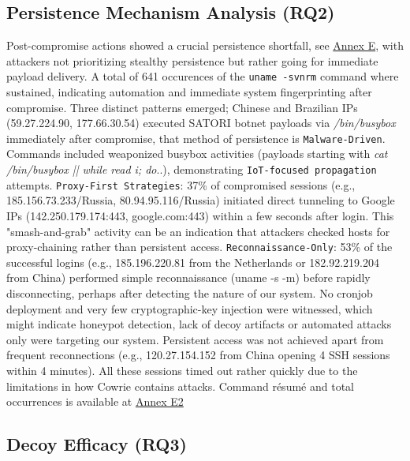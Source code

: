 \documentclass{cls/ULBreport}
\begin{document}
\subsection{Persistence Mechanism Analysis (RQ2)}
Post-compromise actions showed a crucial persistence shortfall, see \hyperref[annex:log-persistence1]{Annex E}, with attackers not prioritizing stealthy persistence but rather going for immediate payload delivery. A total of 641 occurences of the \texttt{uname -svnrm} command where sustained, indicating automation and immediate system fingerprinting after compromise. Three distinct patterns emerged; Chinese and Brazilian IPs (59.27.224.90, 177.66.30.54) executed SATORI botnet payloads via \textit{/bin/busybox} immediately after compromise, that method of persistence is \texttt{Malware-Driven}. Commands included weaponized busybox activities (payloads starting with \textit{cat /bin/busybox || while read i; do}..), demonstrating \texttt{IoT-focused propagation} attempts. \texttt{Proxy-First Strategies}: 37{\%} of compromised sessions (e.g., 185.156.73.233/Russia, 80.94.95.116/Russia) initiated direct tunneling to Google IPs (142.250.179.174:443, google.com:443) within a few seconds after login. This "smash-and-grab" activity can be an indication that attackers checked hosts for proxy-chaining rather than persistent access. \texttt{Reconnaissance-Only}: 53{\%} of the successful logins (e.g., 185.196.220.81 from the Netherlands or 182.92.219.204 from China) performed simple reconnaissance (uname -s -m) before rapidly disconnecting, perhaps after detecting the nature of our system. No cronjob deployment and very few cryptographic-key injection were witnessed, which might indicate honeypot detection, lack of decoy artifacts or automated attacks only were targeting our system. Persistent access was not achieved apart from frequent reconnections (e.g., 120.27.154.152 from China opening 4 SSH sessions within 4 minutes). All these sessions timed out rather quickly due to the limitations in how Cowrie contains attacks. Command résumé and total occurrences is available at \hyperref[annex:log-persistence2]{Annex E2}






\subsection{Decoy Efficacy (RQ3)}
\end{document}
